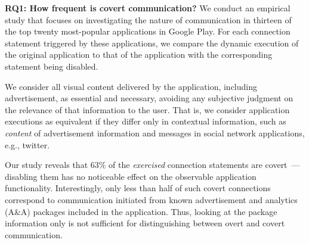 \noindent 
{\bf RQ1: How frequent is covert communication?} %
We conduct an empirical study that focuses on %
investigating the nature of communication in thirteen of the 
top twenty most-popular applications in Google Play.  
For each connection statement triggered by these applications, we compare the dynamic execution of the original application to that of the application with the corresponding statement being disabled. 

We consider all visual content delivered by the application, including advertisement, as essential and necessary, avoiding any subjective judgment on the relevance of that information to the user.  
That is, we consider application executions as
equivalent if they %
differ only in contextual information, such as   
\emph{content} of advertisement information and messages in social network
applications, e.g., twitter.

Our study reveals that 63\% of
the \emph{exercised} connection statements are covert~--- disabling
them has no noticeable effect on the observable application
functionality. Interestingly, only less than half of such covert connections correspond to communication initiated from known advertisement and analytics (A\&A) packages included in the application.
Thus, looking at the package information only is not sufficient for distinguishing between
overt and covert communication. 

